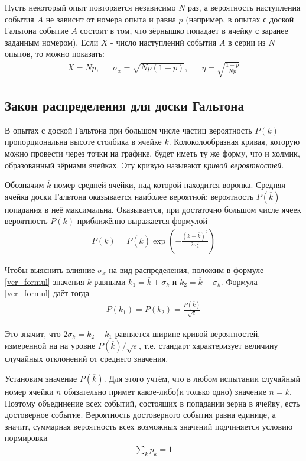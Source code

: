 Пусть некоторый опыт повторяется независимо $N$ раз, а вероятность наступления события $A$ не зависит от номера опыта и равна $p$ (например, в опытах с доской Гальтона событие $A$ состоит в том, что зёрнышко попадает в ячейку с заранее заданным номером). Если $X$ - число наступлений события $A$ в серии из $N$ опытов, то можно показать:
\begin{align}
	\overline{X} = N p, && \sigma_x = \sqrt{N p (1 - p)}, && \eta = \sqrt{\frac{1 - p}{N p}}
\end{align}

\subsection{Закон распределения для доски Гальтона}

В опытах с доской Гальтона при большом числе частиц вероятность $P(k)$ пропорциональна высоте столбика в ячейке $k$. Колоколообразная кривая, которую можно провести через точки на графике, будет иметь ту же форму, что и холмик, образованный зёрнами  ячейках. Эту кривую называют \textit{кривой вероятностей}.

Обозначим $\overline{k}$ номер средней ячейки, над которой находится воронка. Средняя ячейка доски Гальтона оказывается наиболее вероятной: вероятность $P(\overline{k})$ попадания в неё максимальна. Оказывается, при достаточно большом числе ячеек вероятность $P(k)$ приближённо выражается формулой
\begin{align} \label{ver_formul}
	P(k) = P(\overline{k})
	\exp \left( - \frac{(k - \overline{k})^2}{2 \sigma_x^2} \right)
\end{align}

Чтобы выяснить влияние $\sigma_x$ на вид распределения, положим в формуле \eqref{ver_formul} значения $k$ равными $k_1 = \overline{k} + \sigma_k$ и $k_2 = \overline{k} - \sigma_k$. Формула \eqref{ver_formul} даёт тогда 
\begin{align*}
	P(k_1) = P(k_2) = \frac{P(\overline{k})}{\sqrt{e}} 
\end{align*}

Это значит, что $2\sigma_k = k_2 - k_1$ равняется ширине кривой вероятностей, измеренной на на уровне ${P(\overline{k})}/{\sqrt{e}}$, т.е. стандарт характеризует величину случайных отклонений от среднего значения.

Установим значение $P(\overline{k})$. Для этого учтём, что в любом испытании случайный номер ячейки $n$ обязательно примет какое-либо(и только одно) значение $n = k$. Поэтому объединение всех событий, состоящих в попадании зерна в ячейку, есть достоверное событие. Вероятность достоверного события равна единице, а значит, суммарная вероятность всех возможных значений подчиняется условию нормировки 
\begin{align} \label{usl_normir}
	\sum_{k} p_k = 1
\end{align}

